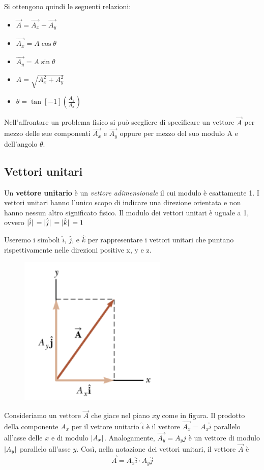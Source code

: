 \documentclass[a4paper,11pt,oneside]{book}
\begin{document}
\noindent Si ottengono quindi le seguenti relazioni:
\begin{itemize}
    \item $\vec{A} = \vec{A_x} + \vec{A_y}$
    \item $\vec{A_x} = A \cos{\theta}$
    \item $\vec{A_y} = A \sin{\theta}$
    \item $A = \sqrt{A_x^2 + A_y^2}$
    \item $\theta = \tan[-1](\frac{A_y}{A_x})$
\end{itemize}
Nell’affrontare un problema fisico si può scegliere di specificare un vettore $\vec{A}$
per mezzo delle sue componenti $\vec{A_x}$ e $\vec{A_y}$ oppure per mezzo del suo modulo A e dell’angolo $\theta$.

\subsection{Vettori unitari}
Un \textbf{vettore unitario} è un \emph{vettore adimensionale} il cui modulo è esattamente 1.
I vettori unitari hanno l'unico scopo di indicare una direzione orientata e non hanno nessun altro significato fisico.
Il modulo dei vettori unitari è uguale a 1, ovvero $\abs*{\hat{i}} = \abs*{\hat{j}} = \abs*{\hat{k}} = 1$

Useremo i simboli $\hat{i}$, $\hat{j}$, e $\hat{k}$ per rappresentare i vettori unitari che puntano rispettivamente nelle direzioni positive x, y e z.

\newpage
\begin{figure}[h]
    \includegraphics[scale=0.5]{vettori_unitari}
    \centering
\end{figure}
Consideriamo un vettore $\vec{A}$ che giace nel piano $xy$ come in figura.
Il prodotto della componente $A_x$ per il vettore unitario $\hat{i}$ è il vettore $\vec{A_x} = A_x \hat{i}$ parallelo all'asse delle $x$ e di modulo $\abs{A_x}$.
Analogamente, $\vec{A_y} = A_y \hat{j}$ è un vettore di modulo $\abs{A_y}$ parallelo all’asse $y$.
Così, nella notazione dei vettori unitari, il vettore $\vec{A}$ è
\begin{equation*}
    \vec{A} = A_x \hat{i} \cdot A_y \hat{j}
\end{equation*}
\end{document}
